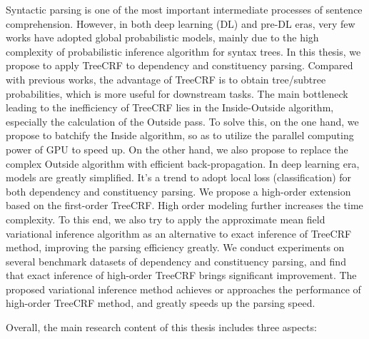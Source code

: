 
\begin{eabstract}
	Syntactic parsing is one of the most important intermediate processes of sentence comprehension.
	However, in both deep learning (DL) and pre-DL eras, very few works have adopted global probabilistic models, mainly due to the high complexity of probabilistic inference algorithm for syntax trees.
	In this thesis, we propose to apply TreeCRF to dependency and constituency parsing.
	Compared with previous works, the advantage of TreeCRF is to obtain tree/subtree probabilities, which is more useful for downstream tasks.
	The main bottleneck leading to the inefficiency of TreeCRF lies in the Inside-Outside algorithm, especially the calculation of the Outside pass.
	To solve this, on the one hand, we propose to batchify the Inside algorithm, so as to utilize the parallel computing power of GPU to speed up.
	On the other hand, we also propose to replace the complex Outside algorithm with efficient back-propagation.
	In deep learning era, models are greatly simplified.
	It's a trend to adopt local loss (classification) for both dependency and constituency parsing.
	We propose a high-order extension based on the first-order TreeCRF.
	High order modeling further increases the time complexity.
	To this end, we also try to apply the approximate mean field variational inference algorithm as an alternative to exact inference of TreeCRF method, improving the parsing efficiency greatly.
	We conduct experiments on several benchmark datasets of dependency and constituency parsing, and find that exact inference of high-order TreeCRF brings significant improvement.
	The proposed variational inference method achieves or approaches the performance of high-order TreeCRF method, and greatly speeds up the parsing speed.
	
	Overall, the main research content of this thesis includes three aspects:
	

\end{eabstract}
